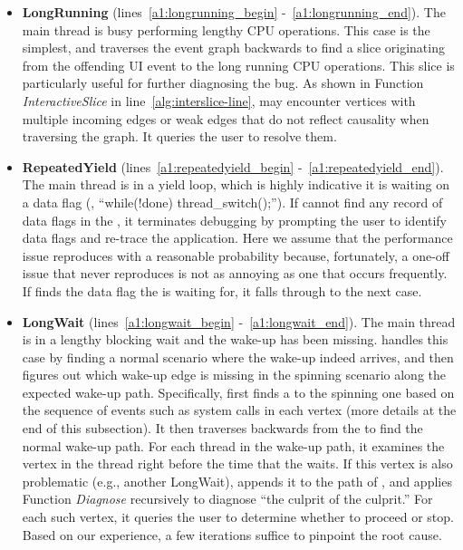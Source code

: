 \begin{itemize}
	\item \textbf{LongRunning} (lines~\ref{a1:longrunning_begin}
		-~\ref{a1:longrunning_end}). The main thread is busy performing lengthy
		CPU operations. This case is the simplest, and \xxx traverses the event
		graph backwards to find a slice originating from the offending UI event
		to the long running CPU operations. This slice is particularly useful for
		further diagnosing the bug. As shown in Function \textit{InteractiveSlice} in
		line~\ref{alg:interslice-line}, \xxx may encounter vertices with multiple
		incoming edges or weak edges that do not reflect causality when traversing
		the graph. It queries the user to resolve them.

	\item \textbf{RepeatedYield} (lines~\ref{a1:repeatedyield_begin}
		-~\ref{a1:repeatedyield_end}). The main thread is in a yield loop, which
		is highly indicative it is waiting on a data flag (\eg, ``while(!done)
		thread\_switch();''). If \xxx cannot find any record of data flags in the
		\spinningnode, it terminates debugging by prompting the user to identify data
		flags and re-trace the application. Here we assume that the performance issue
		reproduces with a reasonable probability because, fortunately, a one-off issue
		that never reproduces is not as annoying as one that occurs frequently. If
		\xxx finds the data flag the \spinningnode is waiting for, it falls through to
		the next case.

	\item \textbf{LongWait} (lines~\ref{a1:longwait_begin}
		-~\ref{a1:longwait_end}). The main thread is in a lengthy blocking wait and
		the wake-up has been missing. \xxx handles this case by finding a normal
		scenario where the wake-up indeed arrives, and then figures out which wake-up
		edge is missing in the spinning scenario along the expected wake-up path.
                Specifically, \xxx first finds a \similarnode to the spinning one based
		on the sequence of events such as system calls in each vertex (more details
                at the end of this subsection). It then traverses backwards from the \similarnode
                to find the normal wake-up path. For each thread in the wake-up path, it examines
                the vertex in the thread right before the time that the \spinningnode waits. If this
                vertex is also problematic (e.g., another LongWait), \xxx appends it to the path of
                \rootcausenodes, and applies
                Function \textit{Diagnose} recursively to diagnose ``the culprit of the culprit.''
                For each such vertex, it queries the user to determine whether to proceed or stop.
                Based on our experience, a few iterations suffice to pinpoint the root cause.

\end{itemize}

